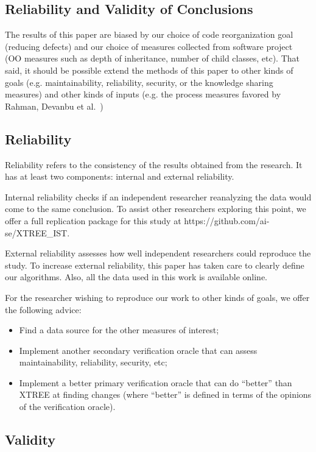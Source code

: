 \documentclass[twocolumn,5p]{elsarticle}
\newcommand{\bi}{\begin{itemize}[leftmargin=0.4cm]}
\newcommand{\ei}{\end{itemize}}
\theoremstyle{break}
\begin{document}
\begin{itemize}
\section{Reliability and Validity of Conclusions}
\label{sect:valid}



The results of this paper are biased by our choice of code reorganization 
goal (reducing defects) and our choice of measures collected from software 
project (OO measures such as depth of inheritance, number of child classes, 
etc). That said, it should be possible extend the methods of this paper to other 
kinds of goals (e.g. maintainability, reliability, security, or the knowledge sharing
measures) and other kinds of 
inputs (e.g. the process measures favored by Rahman, 
Devanbu et al.~\cite{Rahman2013}) 

\subsection{Reliability}
Reliability refers to the consistency of the results obtained
from the research. It has at least two components: internal
and external reliability.

Internal reliability checks if an independent researcher
reanalyzing the data would come to the same conclusion. 
To assist other researchers exploring this point, we offer a full replication package for this study at  
https://github.com/ai-se/XTREE\_IST.

External reliability assesses how well independent researchers
could reproduce the study. To increase external
reliability, this paper has taken care to clearly define our
algorithms. Also, all the data used in this work is available
online. 

For the researcher wishing to reproduce our work to other kinds of goals, we offer the following advice:

\bi
\item Find a data source for the other measures of interest;
\item Implement another secondary verification oracle that can assess maintainability, reliability, security, etc;
\item Implement a better primary verification oracle that can do ``better'' than XTREE at finding changes (where ``better'' is defined in terms 
of the opinions of the verification oracle).
\ei


\subsection{Validity}


\end{itemize}
\end{document}
